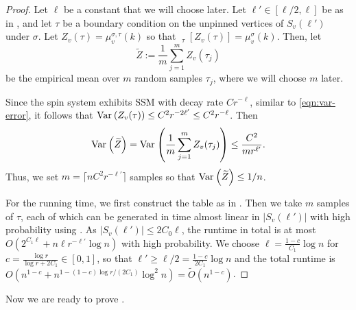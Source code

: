 \documentclass[10pt,a4paper]{article}
\newcommand{\Ex}{\mathop{\mathbb{{}E}}\nolimits}
\newcommand{\abs}[1]{\ensuremath{\left\vert#1\right\vert}}
\newcommand{\Var}[2]{\ensuremath{\textnormal{Var}_{#1}\left(#2\right)}}
\newcommand{\defeq}{:=}
\begin{document}
\begin{proof}
  Let $\ell$ be a constant that we will choose later.
  Let $\ell'\in[\ell/2,\ell]$ be as in ,
  and let $\tau$ be a boundary condition on the unpinned vertices of $S_{v}(\ell')$ under $\sigma$.
  Let $Z_{v}(\tau)=\mu_{v}^{\sigma,\tau}(k)$ so that $\Ex_\tau[Z_{v}(\tau)]=\mu_{v}^{\sigma}(k)$. 
  Then, let
  \[\widetilde{Z}\defeq\frac{1}{m}\sum_{j=1}^mZ_{v}(\tau_j)\]
  be the empirical mean over $m$ random samples $\tau_j$,
  where we will choose $m$ later. 

  Since the spin system exhibits SSM with decay rate $Cr^{-\ell}$,
  similar to \eqref{eqn:var-error},
  it follows that $\Var{}{Z_{v}(\tau)}\le C^2r^{-2\ell'}\le C^2r^{-\ell}$. Then
  \[\Var{}{\widetilde{Z}}=\Var{}{\frac{1}{m}\sum_{j=1}^mZ_{v}(\tau_j)}\le\frac{C^2}{mr^{\ell'}}.\]
  Thus, we set $m=\lceil nC^2r^{-\ell'} \rceil$ samples so that $\Var{}{\widetilde{Z}}\leq 1/n$. 

  For the running time,
  we first construct the table as in .
  Then we take $m$ samples of $\tau$, each of which can be generated in time almost linear in $\abs{S_{v}(\ell')}$ with high probability using .
  As $\abs{S_{v}(\ell')}\le 2C_0\ell$,
  the runtime in total is at most $O(2^{C_1\ell}+n\ell r^{-\ell'}\log n)$ with high probability.
  We choose $\ell=\frac{1-c}{C_1}\log n$ for $c=\frac{\log r}{\log r+2C_1}\in[0,1]$,
  so that $\ell' \geq \ell /2 = \frac{1-c}{2C_1} \log n$  and the total runtime is $O(n^{1-c}+n^{1-(1-c)\log r/(2C_1)}\log^2 n)=\widetilde{O}(n^{1-c})$.
\end{proof}

Now we are ready to prove . 
\end{document}
